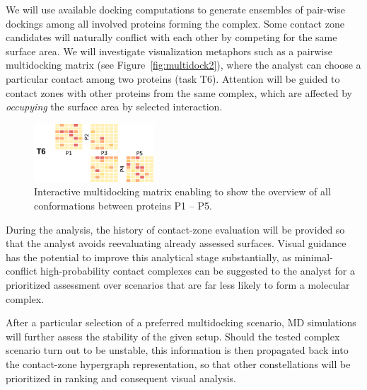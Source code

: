 \documentclass[11pt,a4paper,titlepage,oneside,onecolumn]{article}
\begin{document}
We will use available docking computations to generate ensembles of pair-wise dockings among all involved proteins forming the complex. 
Some contact zone candidates will naturally conflict with each other by competing for the same surface area. 
We will investigate visualization metaphors such as a pairwise multidocking matrix (see Figure~\ref{fig:multidock2}), where the analyst can choose a particular contact among two proteins (task T6). 
Attention will be guided to contact zones with other proteins from the same complex, which are affected by \emph{occupying} the surface area by selected interaction. 

\begin{figure}
  \begin{center}
    \includegraphics[width=0.4\textwidth]{pics/multidock2.png}
  \end{center}
  \caption{Interactive multidocking matrix enabling to show the overview of all conformations between proteins P1 -- P5.}
\end{figure}

During the analysis, the history of contact-zone evaluation will be provided so that the analyst avoids reevaluating already assessed surfaces. 
Visual guidance has the potential to improve this analytical stage substantially, as minimal-conflict high-probability contact complexes can be suggested to the analyst for a prioritized assessment over scenarios that are far less likely to form a molecular complex.

After a particular selection of a preferred multidocking scenario, MD simulations will further assess the stability of the given setup. 
Should the tested complex scenario turn out to be unstable, this information is then propagated back into the contact-zone hypergraph representation, so that other constellations will be prioritized in ranking and consequent visual analysis.
\end{document}
